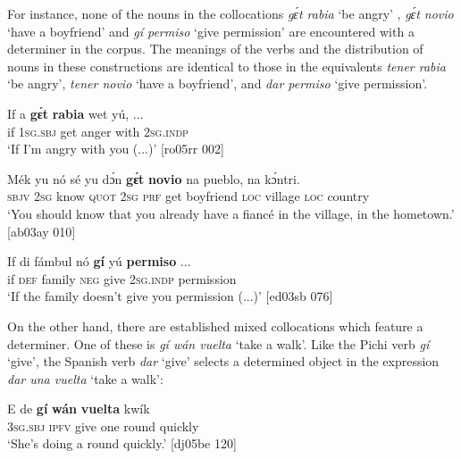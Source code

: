 For instance, none of the nouns in the collocations \textit{gɛ́t rabia} ‘be angry’ , \textit{gɛ́t novio} ‘have a boyfriend’  and \textit{gí permiso} ‘give permission’  are encountered with a determiner in the corpus. The meanings of the verbs and the distribution of nouns in these constructions are identical to those in the  equivalents \textit{tener rabia} ‘be angry’, \textit{tener novio} ‘have a boyfriend’, and \textit{dar permiso} ‘give permission’. 



\ea%
    \label{ex:key:1166}
    \gll If  a    \textbf{gɛ́t}  \textbf{rabia}  wet    yú,    \op...\cp{}\\
if  \textsc{1sg.sbj}  get  anger  with    \textsc{2sg.indp}\\
\glt ‘If I’m angry with you (...)’  [ro05rr 002]
\z

\ea%
    \label{ex:key:1167}
    \gll Mék  yu  nó    sé    yu  dɔ́n  \textbf{gɛ́t}  \textbf{novio}    na
pueblo,  na  kɔ́ntri.\\
\textsc{sbjv}  \textsc{2sg}  know  \textsc{quot}    \textsc{2sg}  \textsc{prf}  get  boyfriend  \textsc{loc}
village  \textsc{loc}  country\\

\glt ‘You should know that you already have a fiancé in the village, 
in the hometown.’ [ab03ay 010]
\z


\ea%
    \label{ex:key:1168}
    \gll If  di  fámbul  nó  \textbf{gí}  yú    \textbf{permiso}    \op...\cp{}\\
if  \textsc{def}  family  \textsc{neg}  give  \textsc{2sg.indp}  permission\\

\glt ‘If the family doesn’t give you permission (...)’ [ed03sb 076]
\z

On the other hand, there are established mixed collocations which feature a determiner. One of these is \textit{gí wán vuelta} ‘take a walk’. Like the Pichi verb \textit{gí} ‘give’, the Spanish verb \textit{dar} ‘give’ selects a determined object in the expression \textit{dar una vuelta} ‘take a walk’: 


\ea%
    \label{ex:key:1169}
    \gll E    de  \textbf{gí}  \textbf{wán}    \textbf{vuelta}  kwík\\
\textsc{3sg.sbj}  \textsc{ipfv}  give  one    round  quickly\\

\glt ‘She’s doing a round quickly.’ [dj05be 120]
\z

